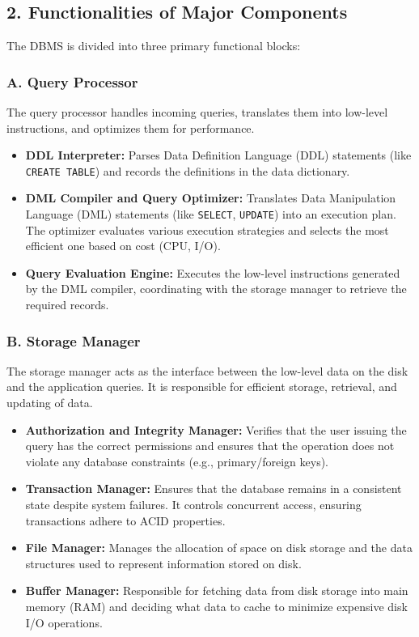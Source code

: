 \documentclass[12pt,a3paper]{article}
\begin{document}
\begin{enumerate}
\begin{tcolorbox}[enhanced,breakable,ansbox,colback=cA!4,colframe=cA,boxrule=0.8pt,arc=5pt,title={\textbf{Answer}},fonttitle=\bfseries\color{white},colbacktitle=cA]
\subsection*{2. Functionalities of Major Components}

The DBMS is divided into three primary functional blocks:

\subsubsection*{A. Query Processor}
The query processor handles incoming queries, translates them into low-level instructions, and optimizes them for performance.
\begin{itemize}
    \item \textbf{DDL Interpreter:} Parses Data Definition Language (DDL) statements (like \texttt{CREATE TABLE}) and records the definitions in the data dictionary.
    \item \textbf{DML Compiler and Query Optimizer:} Translates Data Manipulation Language (DML) statements (like \texttt{SELECT}, \texttt{UPDATE}) into an execution plan. The optimizer evaluates various execution strategies and selects the most efficient one based on cost (CPU, I/O).
    \item \textbf{Query Evaluation Engine:} Executes the low-level instructions generated by the DML compiler, coordinating with the storage manager to retrieve the required records.
\end{itemize}

\subsubsection*{B. Storage Manager}
The storage manager acts as the interface between the low-level data on the disk and the application queries. It is responsible for efficient storage, retrieval, and updating of data.
\begin{itemize}
    \item \textbf{Authorization and Integrity Manager:} Verifies that the user issuing the query has the correct permissions and ensures that the operation does not violate any database constraints (e.g., primary/foreign keys).
    \item \textbf{Transaction Manager:} Ensures that the database remains in a consistent state despite system failures. It controls concurrent access, ensuring transactions adhere to ACID properties.
    \item \textbf{File Manager:} Manages the allocation of space on disk storage and the data structures used to represent information stored on disk.
    \item \textbf{Buffer Manager:} Responsible for fetching data from disk storage into main memory (RAM) and deciding what data to cache to minimize expensive disk I/O operations.
\end{itemize}


\end{tcolorbox}
\end{enumerate}
\end{document}
